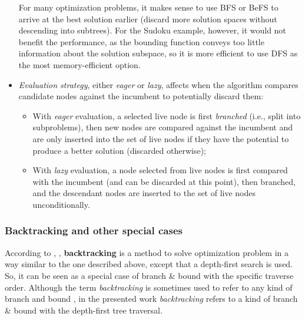 \begin{itemize}
        For many optimization problems, it makes sense to use BFS or BeFS to arrive at the best
        solution earlier (discard more solution spaces without descending into subtrees).
        For the Sudoku example, however, it would not benefit the performance, as the bounding
        function conveys too little information about the solution subspace, so it is more efficient
        to use DFS as the most memory-efficient option.

    \item \emph{Evaluation strategy}, either \emph{eager} or \emph{lazy}, affects when the
        algorithm compares candidate nodes against the incumbent to potentially discard them:
        \begin{itemize}
            \item With \emph{eager} evaluation, a selected live node is first \emph{branched}
                (i.e., split into subproblems), then
                new nodes are compared against the incumbent and are only inserted into the set
                of live nodes if they have the potential to produce a better solution
                (discarded otherwise);
            \item With \emph{lazy} evaluation, a node selected from live nodes is first compared
                with the incumbent (and can be discarded at this point), then branched,
                and the descendant nodes are inserted to the set of live nodes unconditionally.
        \end{itemize}
\end{itemize}

\subsubsection{Backtracking and other special cases}

According to \cite{shilov2012verifmono}, \cite{indriyono2024sudoku}, \textbf{backtracking}
is a method to solve optimization problem in a way similar to the one described above, except
that a depth-first search is used. So, it can be seen as a special case of branch \& bound
with the specific traverse order. Although the term \emph{backtracking} is sometimes used
to refer to any kind of branch and bound \cite{finkel1987distrib}, in the presented work
\emph{backtracking} refers to a kind of branch \& bound with the depth-first tree traversal.

